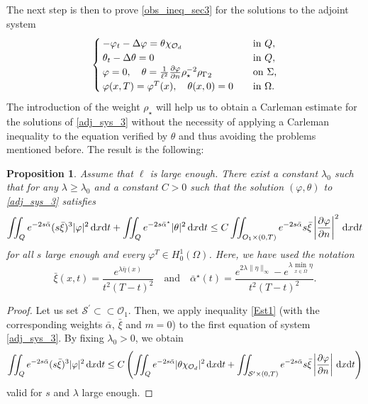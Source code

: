 \documentclass[preprint,10pt]{article}
\newtheorem{proposition}[theorem]{Proposition}
\numberwithin{equation}{section}
\numberwithin{theorem}{section}
\def\dx{\,\textnormal{d}x}
\def\dt{\textnormal{d}t}
\def\csbd{\rho_{\Gamma}}
\def\dx{\,\textnormal{d}x}
\def\dt{\textnormal{d}t}
\begin{document}
{The next step is then to prove \eqref{obs_ineq_sec3} for the solutions to the adjoint system
%
\begin{equation}\label{adj_sys_3}
\begin{cases}
-\varphi_t-\Delta \varphi= \theta\chi_{\mathcal O_d} \quad&\textnormal{in }Q, \\
\theta_t-\Delta \theta=0 \quad& \textnormal{in }Q, \\
\varphi=0, \quad \theta=\frac{1}{\ell^2}\frac{\partial \varphi}{\partial n}\rho_{\star}^{-2}{\csbd}_2 \quad &\textnormal{on $\Sigma$,} \\
\varphi(x,T)=\varphi^T(x), \quad \theta(x,0)=0 \quad &\textnormal{in $\Omega$}.
\end{cases}
\end{equation}
%
The introduction of the weight $\rho_\star$ will help us to obtain a Carleman estimate for the solutions of \eqref{adj_sys_3} without the necessity of applying a Carleman inequality to the equation verified by $\theta$ and thus avoiding the problems mentioned before. The result is the following:
%
\begin{proposition}\label{prop_4_final}
%
Assume that $\ell$ is large enough. There exist a constant $\lambda_0$ such that for any $\lambda\geq \lambda_0$ and a constant $C>0$ such that the solution $(\varphi,\theta)$ to \eqref{adj_sys_3} satisfies 
%
\begin{equation}\label{car_final_sec3}
\iint_{Q}e^{-2s\bar\alpha}(s\bar\xi)^3|\varphi|^2\dx\dt+\iint_{Q}e^{-2s\bar\alpha^\star}|\theta|^2\dx\dt\leq C\iint_{\mathcal \mathcal O_1\times(0,T)}e^{-2s\bar\alpha}s\bar\xi\left|\frac{\partial \varphi}{\partial n}\right|^2\dx\dt
\end{equation}
%
for all $s$ large enough and every $\varphi^T\in H_0^1(\Omega)$. Here, we have used the notation
%
\begin{equation*}
\bar\xi(x,t)=\frac{e^{\lambda\bar\eta(x)}}{t^2(T-t)^2} \quad\text{and}\quad \bar\alpha^\star(t)=\frac{e^{2\lambda\|\eta\|_\infty}-e^{\lambda\min_{x\in \overline\Omega}\eta}}{t^2(T-t)^2}.
\end{equation*}
%
\end{proposition}
%

\begin{proof}
Let us set $\mathcal S^\prime\subset\subset \mathcal O_1$. Then, we apply inequality \eqref{Est1} (with the corresponding weights $\bar\alpha$, $\bar\xi$ and $m=0$) to the first equation of system \eqref{adj_sys_3}. By fixing $\lambda_0>0$, we obtain
%
\begin{equation}\label{car_init_sec3}
\iint_Qe^{-2s\bar\alpha}(s\bar\xi)^3|\varphi|^2\dx\dt\leq C\left(\iint_{Q}e^{-2s\bar\alpha}|\theta\chi_{\mathcal O_d}|^2\dx\dt+\iint_{\mathcal S^\prime\times(0,T)}e^{-2s\bar\alpha}s\bar\xi\left|\frac{\partial \varphi}{\partial n}\right|\dx\dt\right)
\end{equation}
%
valid for $s$ and $\lambda$ large enough. 


\end{proof}}
\end{document}
